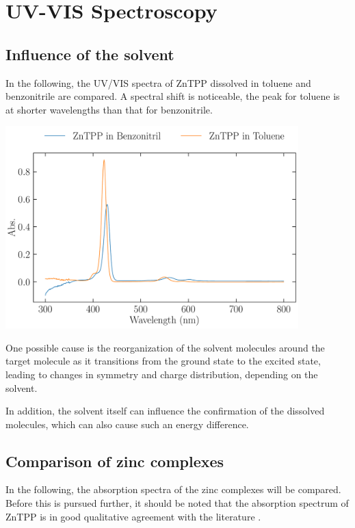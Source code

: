 \section{UV-VIS Spectroscopy}
\label{sec:uv-vis}

\subsection{Influence of the solvent}

In the following, the UV/VIS spectra of ZnTPP dissolved in toluene and benzonitrile are compared. A spectral shift is noticeable, the peak for toluene is at shorter wavelengths than that for benzonitrile.
\begin{center}
    \captionsetup{type = figure}
    \includegraphics[width = 0.85\textwidth]{Pictures/Evaluation/41/ZnTpp-in-Bn-Tol.pdf}
    \label{fig:uv-visBNTol}
\end{center}
One possible cause is the reorganization of the solvent molecules around the target molecule as it transitions from the ground state to the excited state, leading to changes in symmetry and charge distribution, depending on the solvent.

In addition, the solvent itself can influence the confirmation of the dissolved molecules, which can also cause such an energy difference.


\subsection{Comparison of zinc complexes}

In the following, the absorption spectra of the zinc complexes will be compared. Before this is pursued further, it should be noted that the absorption spectrum of ZnTPP is in good qualitative agreement with the literature \citep{Nojiri.1998}.

